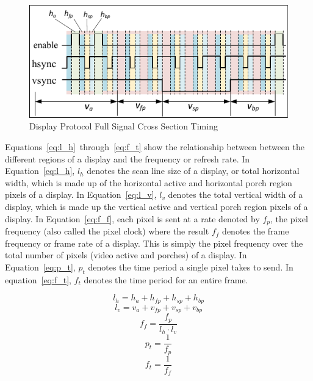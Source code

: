     \begin{figure}[H]
        \centering
        \includegraphics[width=1.0\textwidth]{fig/display_timing_full_cross.pdf}
        \caption{Display Protocol Full Signal Cross Section Timing}
        \label{fig:display_protocol_full_cross}
    \end{figure}

    Equations~\ref{eq:l_h}~through~\ref{eq:f_t} show the relationship between between the different regions of a display and the frequency or refresh rate. In Equation~\ref{eq:l_h}, $l_h$ denotes the scan line size of a display, or total horizontal width, which is made up of the horizontal active and horizontal porch region pixels of a display. In Equation~\ref{eq:l_v}, $l_v$ denotes the total vertical width of a display, which is made up the vertical active and vertical porch region pixels of a display. In Equation~\ref{eq:f_f}, each pixel is sent at a rate denoted by $f_p$, the pixel frequency (also called the pixel clock) where the result $f_f$ denotes the frame frequency or frame rate of a display. This is simply the pixel frequency over the total number of pixels (video active and porches) of a display. In Equation~\ref{eq:p_t}, $p_t$ denotes the time period a single pixel takes to send. In equation~\ref{eq:f_t}, $f_t$ denotes the time period for an entire frame.


    \begin{equation}
        l_h=h_a+h_{fp}+h_{sp}+h_{bp}
        \label{eq:l_h}
    \end{equation}
    \begin{equation}
        l_v=v_a+v_{fp}+v_{sp}+v_{bp}
        \label{eq:l_v}
    \end{equation}
    \begin{equation}
        f_f={\frac{f_p}{l_h \cdot l_v}}
        \label{eq:f_f}
    \end{equation}
    \begin{equation}
        p_t={\frac{1}{f_p}}
        \label{eq:p_t}
    \end{equation}
    \begin{equation}
        f_t={\frac{1}{f_f}}
        \label{eq:f_t}
    \end{equation}

